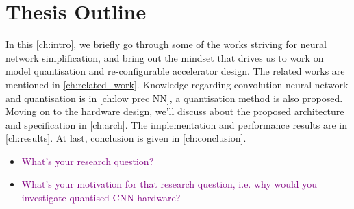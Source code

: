 \section{Thesis Outline}
In this \autoref{ch:intro}, we briefly go through some of the works striving for neural network simplification, and bring out the mindset that drives us to work on model quantisation and re-configurable accelerator design. The related works are mentioned in \autoref{ch:related_work}. Knowledge regarding convolution neural network and quantisation is in \autoref{ch:low prec NN}, a quantisation method is also proposed. Moving on to the hardware design, we'll discuss about the proposed architecture and specification in \autoref{ch:arch}. The implementation and performance results are in \autoref{ch:results}. At last, conclusion is given in \autoref{ch:conclusion}.   \\
\begin{itemize}
    \item \textcolor{purple}{What's your research question?}
    \item \textcolor{purple}{What's your motivation for that research question, i.e. why would you investigate quantised CNN hardware?}
\end{itemize}
